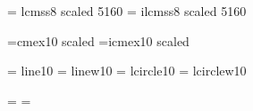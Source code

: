 \font\fortyonerm  = lcmss8  scaled 5160 %
\font\ifortyonerm = ilcmss8 scaled 5160 %
 
\font\tenex =cmex10  scaled
\font\itenex=icmex10 scaled
 
\font\tenln    = line10
\font\tenlnw   = linew10
\font\tencirc  = lcircle10
\font\tencircw = lcirclew10
 
\ifnum{}\tenln=\tencirc \else 
  \fi
\ifnum{}\tenlnw=\tencircw \else 
  \fi
 
 
\lineskip 1pt
\normallineskip 1pt
 
\def\@subfam#1#2{\@warning{No \string#1\space typeface in 
        SLiTeX, using \string#2}#2}
 
 
\def\rm{\protect\prm}
\def\it{\protect\pit}
\def\bf{\protect\pbf}
\def\tt{\protect\ptt}
\def\sl{\@subfam\sl\it}
\def\sf{\@subfam\sf\rm}
\def\sc{\protect\psc}
 
\def\em{\protect\pem{}}
\def\pem{\relax\ifdim \fontdimen\@ne\font >\z@ \rm \else \it \fi}
 
\def\mit{\fam\@ne} 
\def\cal{\fam\tw@}
 
\def\boldmath{\@warning{No \string\boldmath\space in SLiTeX}}
\let\unboldmath=\relax
 
\def\@nomath#1{\relax\ifmmode \@warning{\string#1\space in math mode.}\fi}
 
 
%
\newfam\itfam      %
\newfam\slfam      %
\newfam\bffam      %
\newfam\ttfam      %
\newfam\sffam      %
\newfam\scfam      %
\newfam\lyfam      %
 
 
\def\fourteenpt{\def\prm{\fam\z@\fourteenrm\def\@currfont{\rm}}%
\textfont\z@\fourteenrm \scriptfont\z@\fourteenrm 
  \scriptscriptfont\z@\fourteenrm
\textfont\@ne\fourteeni \scriptfont\@ne\fourteeni 
  \scriptscriptfont\@ne\fourteeni
\textfont\tw@\fourteensy \scriptfont\tw@\fourteensy 
  \scriptscriptfont\tw@\fourteensy
\textfont\thr@@\tenex \scriptfont\thr@@\tenex \scriptscriptfont\thr@@\tenex
\def\pit{\fam\itfam\fourteenit\def\@currfont{\it}}\textfont\itfam\fourteenit 
    \scriptfont\itfam\fourteenit \scriptscriptfont\itfam\fourteenit
\def\pbf{\fam\bffam\fourteenbf\def\@currfont{\bf}}\textfont\bffam\fourteenbf 
   \scriptfont\bffam\fourteenbf \scriptscriptfont\bffam\fourteenbf
\def\ptt{\fam\ttfam\fourteentt\def\@currfont{\tt}}\textfont\ttfam\fourteentt 
    \scriptfont\ttfam\fourteentt \scriptscriptfont\ttfam\fourteentt
\def\psc{\fam\scfam\fourteensc\def\@currfont{\sc}}\textfont\scfam\fourteensc 
    \scriptfont\scfam\fourteensc \scriptscriptfont\scfam\fourteensc
\def\lasy{\fam\lyfam\fourteenlasy\def\@currfont{\lasy}}%
\textfont\lyfam\fourteenlasy \scriptfont\lyfam\fourteenlasy 
   \scriptscriptfont\lyfam\fourteenlasy}
 
